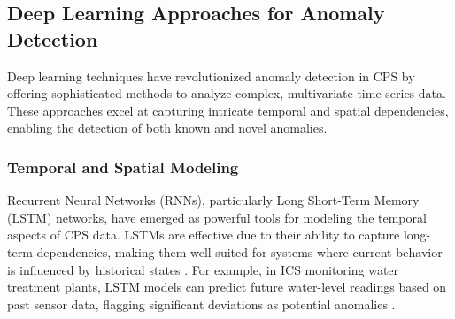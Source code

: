 \begin{comment}
In manufacturing environments, machine learning techniques have been used to analyze physical data, such as images from 3D printing processes or acoustic signals from CNC milling. By establishing a baseline of normal operations and continuously comparing new data against it, these systems can detect anomalies that may indicate cyber-physical attacks or manufacturing defects with high accuracy \cite{52}.

\subsubsection{Conclusion}
Machine learning approaches offer powerful tools for anomaly detection in CPS, capable of processing vast amounts of data and identifying subtle deviations that might indicate threats or system failures. By combining domain knowledge with advanced algorithms, these methods provide a robust framework for enhancing the security and reliability of critical infrastructure systems. As CPS continue to evolve and face new challenges, machine learning-based anomaly detection will play an increasingly important role in safeguarding these complex environments.

\end{comment}
\subsection{Deep Learning Approaches for Anomaly Detection}

Deep learning techniques have revolutionized anomaly detection in CPS by offering sophisticated methods to analyze complex, multivariate time series data. These approaches excel at capturing intricate temporal and spatial dependencies, enabling the detection of both known and novel anomalies.

\subsubsection{Temporal and Spatial Modeling}

Recurrent Neural Networks (RNNs), particularly Long Short-Term Memory (LSTM) networks, have emerged as powerful tools for modeling the temporal aspects of CPS data. LSTMs are effective due to their ability to capture long-term dependencies, making them well-suited for systems where current behavior is influenced by historical states \cite{47}\cite{15}. For example, in ICS monitoring water treatment plants, LSTM models can predict future water-level readings based on past sensor data, flagging significant deviations as potential anomalies \cite{15}.


